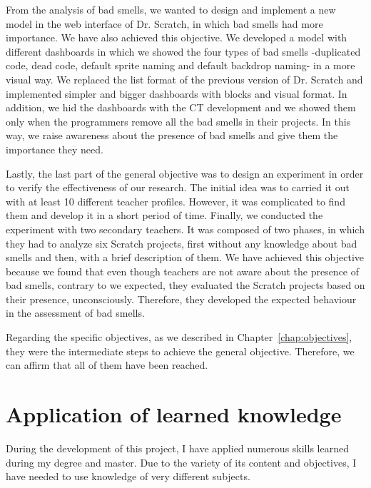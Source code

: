 From the analysis of bad smells, we wanted to design and implement a new model in the web interface of Dr. Scratch, in which bad smells had more importance. We have also achieved this objective. We developed a model with different dashboards in which we showed the four types of bad smells -duplicated code, dead code, default sprite naming and default backdrop naming- in a more visual way. We replaced the list format of the previous version of Dr. Scratch and implemented simpler and bigger dashboards with blocks and visual format. In addition, we hid the dashboards with the CT development and we showed them only when the programmers remove all the bad smells in their projects. In this way, we raise awareness about the presence of bad smells and give them the importance they need. 

Lastly, the last part of the general objective was to design an experiment in order to verify the effectiveness of our research. The initial idea was to carried it out with at least 10 different teacher profiles. However, it was complicated to find them and develop it in a short period of time. Finally, we conducted the experiment with two secondary teachers. It was composed of two phases, in which they had to analyze six Scratch projects, first without any knowledge about bad smells and then, with a brief description of them. We have achieved this objective because we found that even though teachers are not aware about the presence of bad smells, contrary to we expected, they evaluated the Scratch projects based on their presence, unconsciously. Therefore, they developed the expected behaviour in the assessment of bad smells.

\hfill

Regarding the specific objectives, as we described in Chapter~\ref{chap:objectives}, they were the intermediate steps to achieve the general objective. Therefore, we can affirm that all of them have been reached. 


\section{Application of learned knowledge}
\label{sec:applicacion_knowledge}

During the development of this project, I have applied numerous skills learned during my degree and master. Due to the variety of its content and objectives, I have needed to use knowledge of very different subjects.

\hfill

